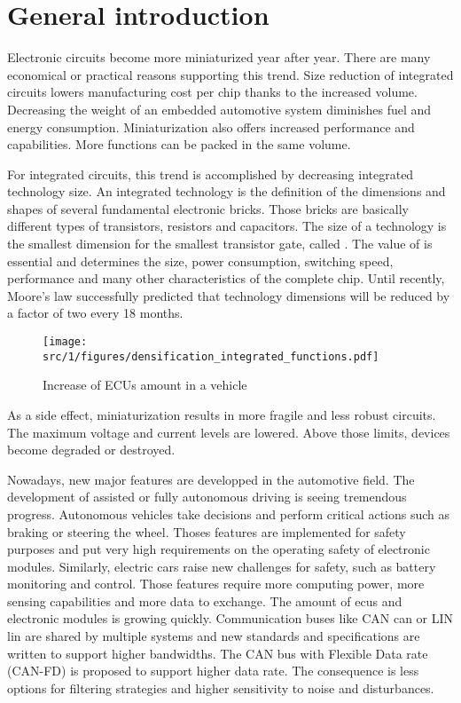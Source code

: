 \section{General introduction}

Electronic circuits become more miniaturized year after year.
There are many economical or practical reasons supporting this trend.
Size reduction of integrated circuits lowers manufacturing cost per chip thanks to the increased volume.
Decreasing the weight of an embedded automotive system diminishes fuel and energy consumption.
Miniaturization also offers increased performance and capabilities.
More functions can be packed in the same volume.

For integrated circuits, this trend is accomplished by decreasing integrated technology size.
An integrated technology is the definition of the dimensions and shapes of several fundamental electronic bricks.
Those bricks are basically different types of transistors, resistors and capacitors.
The size of a technology is the smallest dimension for the smallest transistor gate, called \textlambda.
The value of \textlamda is essential and determines the size, power consumption, switching speed, performance and many other characteristics of the complete chip.
Until recently, Moore's law successfully predicted that technology dimensions will be reduced by a factor of two every 18 months.

\begin{figure}[!h]
  \centering
  \texttt{[image: src/1/figures/densification\_integrated\_functions.pdf]}
  \caption{Increase of ECUs amount in a vehicle}
  \label{fig:ecus-increase}
\end{figure}

As a side effect, miniaturization results in more fragile and less robust circuits.
The maximum voltage and current levels are lowered.
Above those limits, devices become degraded or destroyed.

Nowadays, new major features are developped in the automotive field.
The development of assisted or fully autonomous driving is seeing tremendous progress.
Autonomous vehicles take decisions and perform critical actions such as braking or steering the wheel.
Thoses features are implemented for safety purposes and put very high requirements on the operating safety of electronic modules.
Similarly, electric cars raise new challenges for safety, such as battery monitoring and control.
Those features require more computing power, more sensing capabilities and more data to exchange.
The amount of \gls{ecu}s and electronic modules is growing quickly.
Communication buses like CAN \gls{can} \cite{CAN} or LIN \gls{lin} \cite{LIN} are shared by multiple systems and new standards and specifications are written to support higher bandwidths.
The CAN bus with Flexible Data rate (CAN-FD) \cite{CAN-FD} is proposed to support higher data rate.
The consequence is less options for filtering strategies and higher sensitivity to noise and disturbances.

